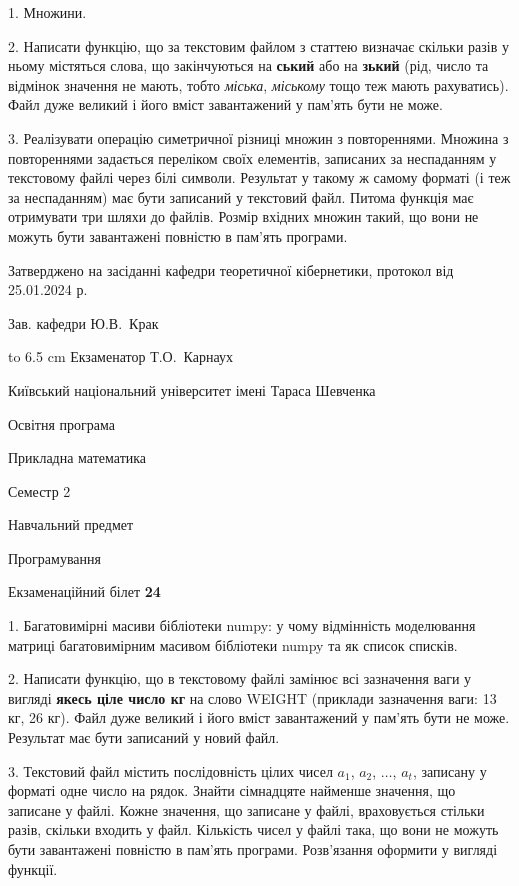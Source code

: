 \documentclass[12pt, ukrainian]{article}
\begin{document}
{%
1. Множини.%
\par
2. Написати функцію, що за текстовим файлом з статтею визначає  скільки разів у ньому містяться слова, що закінчуються на \textbf{ський} або на \textbf{зький} (рід, число та відмінок значення не мають, тобто \textit{міська}, \textit{міському} тощо теж мають рахуватись). Файл дуже великий і його вміст завантажений у пам'ять бути не може.

\par
3. Реалізувати операцію симетричної різниці множин з повтореннями. Множина з повтореннями задається переліком своїх елементів, записаних за неспаданням у текстовому файлі через білі символи. Результат у такому ж самому форматі (і теж за неспаданням) має бути записаний у текстовий файл. Питома функція має отримувати три шляхи до файлів. Розмір вхідних множин такий, що вони не можуть бути завантажені повністю в пам’ять програми.

}
{\smallskip\smallskip \begin {scriptsize} Затверджено на засіданні кафедри теоретичної кібернетики, протокол   від   25.01.2024 р.\par\smallskip\smallskip\smallskip\smallskip
{\parbox {6.5 cm} {Зав. кафедри \dotfill Ю.В.~Крак}}\hspace {0.7cm} {\hbox to 6.5 cm { Екзаменатор \dotfill Т.О.~Карнаух}} \end{scriptsize}}
\vspace{0.9cm}
{{\begin {scriptsize}\par
{ \center  Київський національний університет імені Тараса Шевченка \par}
{\parbox {5 cm}{Освітня програма \hfill}{\parbox {7 cm}{Прикладна математика\hfill}}\parbox {6 cm}{\hfill Семестр 2}}\par
{\parbox {5 cm} {Навчальний предмет \hfill}\parbox {7 cm}{Програмування \hfill}\parbox {6cm}{\hfill}\par}\vspace{-15pt} \end{scriptsize}}{\center Екзаменаційний білет \No \textbf { 24 }\par}}
{%
1. Багатовимірні масиви бібліотеки numpy: у чому відмінність моделювання матриці багатовимірним масивом бібліотеки numpy та як список списків.%
\par
2. Написати функцію, що в текстовому файлі замінює всі зазначення ваги у вигляді \textbf{якесь ціле число кг} на слово WEIGHT (приклади зазначення ваги: 13 кг, 26   кг). Файл дуже великий і його вміст завантажений у пам'ять бути не може. Результат має бути записаний у новий файл.

\par
3. Текстовий файл містить послідовність цілих чисел $a_1$, $a_2$, $\ldots$, $a_t$, записану у форматі одне число на рядок. Знайти сімнадцяте найменше значення, що записане у файлі. Кожне значення, що записане у файлі, враховується стільки разів, скільки входить у файл. Кількість чисел у файлі така, що вони не можуть бути завантажені повністю в пам'ять програми. Розв'язання оформити у вигляді функції.

}
\end{document}
